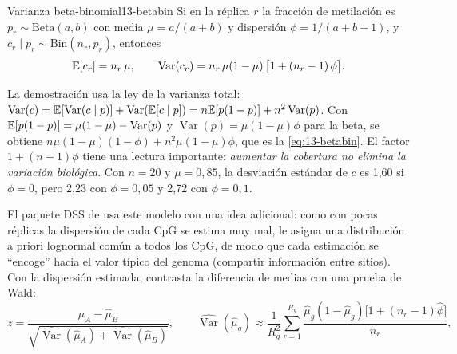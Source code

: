 \begin{teorema}{Varianza beta-binomial}{13-betabin}
Si en la réplica $r$ la fracción de metilación es $p_r\sim\mathrm{Beta}(a,b)$ con media $\mu=a/(a+b)$ y dispersión $\phi=1/(a+b+1)$, y $c_r\mid p_r\sim\mathrm{Bin}(n_r,p_r)$, entonces
\begin{equation}\label{eq:13-betabin}
\mathbb{E}[c_r]=n_r\,\mu,\qquad \operatorname{Var}(c_r) = n_r\,\mu(1-\mu)\,\bigl[1+(n_r-1)\,\phi\bigr].
\end{equation}
\end{teorema}

\begin{simbolos}
\simbolo{$\phi\in[0,1)$}{Dispersión: correlación entre dos lecturas de la misma réplica; $\phi=0$ recupera la binomial.}
\end{simbolos}

La demostración usa la ley de la varianza total: $\operatorname{Var}(c)=\mathbb{E}[\operatorname{Var}(c\mid p)]+\operatorname{Var}(\mathbb{E}[c\mid p]) = n\mathbb{E}[p(1-p)] + n^2\operatorname{Var}(p)$. Con $\mathbb{E}[p(1-p)] = \mu(1-\mu)-\operatorname{Var}(p)$ y $\operatorname{Var}(p)=\mu(1-\mu)\phi$ para la beta, se obtiene $n\mu(1-\mu)(1-\phi)+n^2\mu(1-\mu)\phi$, que es la \cref{eq:13-betabin}. El factor $1+(n-1)\phi$ tiene una lectura importante: \emph{aumentar la cobertura no elimina la variación biológica}. Con $n=20$ y $\mu=0{,}85$, la desviación estándar de $c$ es 1,60 si $\phi=0$, pero 2,23 con $\phi=0{,}05$ y 2,72 con $\phi=0{,}1$.

El paquete DSS de \textcite{c13-feng2014} usa este modelo con una idea adicional: como con pocas réplicas la dispersión de cada CpG se estima muy mal, le asigna una distribución a priori lognormal común a todos los CpG, de modo que cada estimación se ``encoge'' hacia el valor típico del genoma (compartir información entre sitios). Con la dispersión estimada, contrasta la diferencia de medias con una prueba de Wald:
\begin{equation}\label{eq:13-wald}
z = \frac{\hat\mu_A-\hat\mu_B}{\sqrt{\widehat{\operatorname{Var}}(\hat\mu_A)+\widehat{\operatorname{Var}}(\hat\mu_B)}},\qquad
\widehat{\operatorname{Var}}(\hat\mu_g)\approx \frac{1}{R_g^2}\sum_{r=1}^{R_g}\frac{\hat\mu_g(1-\hat\mu_g)\bigl[1+(n_r-1)\hat\phi\bigr]}{n_r},
\end{equation}
\begin{simbolos}
\end{simbolos}

